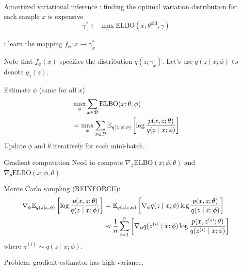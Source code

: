 \documentclass[usenames,dvipsnames,notes]{beamer}
\begin{document}
\begin{frame}
    {Amortized variational inference}
    : finding the optimal variation distribution for each sample $x$ is expensive
            $$\gamma^*_x \leftarrow \max_\gamma \text{ELBO}(x;\theta^{\text{old}}, \gamma)$$ 

    : learn the mapping $f_\phi\colon x \rightarrow \gamma^*_x$ 

    Note that $f_\phi(x)$ specifies the distribution $q(z;\gamma_x)$.
    Let's use $q(z\mid x;\phi)$ to denote $q_\gamma(z)$.

    Estimate $\phi$ (same for all $x$)
    \begin{align*}
        & \max_\phi \sum_{x\in\mathcal{D}}\text{ELBO}(x;\theta, \phi)\\
        &= \max_\phi \sum_{x\in\mathcal{D}} \mathbb{E}_{q(z\mid x; \phi)} \left[ \log \frac{p(x,z;\theta)}{q(z\mid x;\phi)} \right]
    \end{align*}
    Update $\phi$ and $\theta$ iteratively for each mini-batch.
\end{frame}

\begin{frame}
    {Gradient computation}
    Need to compute $\nabla_\phi \text{ELBO}(x;\phi,\theta)$ and $\nabla_\theta \text{ELBO}(x;\phi,\theta)$

    Monte Carlo sampling (REINFORCE):
    \begin{align*}
    \nabla_\phi \mathbb{E}_{q(z\mid x; \phi)} \left[ \log \frac{p(x,z;\theta)}{q(z\mid x;\phi)} \right]
        &= \mathbb{E}_{q(z\mid x; \phi)} \left[ \nabla_\phi q(z\mid x; \phi)  \log \frac{p(x,z;\theta)}{q(z\mid x;\phi)} \right] \\
        &\approx \frac{1}{n}\sum_{i=1}^n \left[ \nabla_\phi q(z^{(i)}\mid x; \phi)  \log \frac{p(x,z^{(i)};\theta)}{q(z^{(i)}\mid x;\phi)} \right]
    \end{align*}
    where $z^{(i)}\sim q(z\mid x; \phi)$.

    Problem: gradient estimator has \alert{high variance}.
\end{frame}
\end{document}
